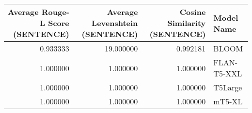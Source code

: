 \begin{tabular}{rrrl}
\toprule
Average Rouge-L Score (SENTENCE) & Average Levenshtein (SENTENCE) & Cosine Similarity (SENTENCE) & Model Name \\
\midrule
0.933333 & 19.000000 & 0.992181 & BLOOM \\
1.000000 & 1.000000 & 1.000000 & FLAN-T5-XXL \\
1.000000 & 1.000000 & 1.000000 & T5Large \\
1.000000 & 1.000000 & 1.000000 & mT5-XL \\
\bottomrule
\end{tabular}
